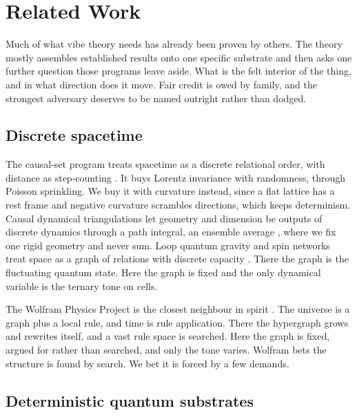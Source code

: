 \section{Related Work}

Much of what vibe theory needs has already been proven by others. The theory mostly assembles established results
onto one specific substrate and then asks one further question those programs leave aside. What is the felt
interior of the thing, and in what direction does it move. Fair credit is owed by family, and the strongest
adversary deserves to be named outright rather than dodged.

\subsection{Discrete spacetime}

The causal-set program treats spacetime as a discrete relational order, with distance as step-counting
\cite{bombelli1987causalsets, rideout1999, surya2019}. It buys Lorentz invariance with randomness, through Poisson
sprinkling. We buy it with curvature instead, since a flat lattice has a rest frame and negative curvature
scrambles directions, which keeps determinism. Causal dynamical triangulations let geometry and dimension be
outputs of discrete dynamics through a path integral, an ensemble average \cite{ambjorn2004, loll2019}, where we
fix one rigid geometry and never sum. Loop quantum gravity and spin networks treat space as a graph of relations
with discrete capacity \cite{rovelli1995}. There the graph is the fluctuating quantum state. Here the graph is
fixed and the only dynamical variable is the ternary tone on cells.

The Wolfram Physics Project is the closest neighbour in spirit \cite{wolfram2020}. The universe is a graph plus a
local rule, and time is rule application. There the hypergraph grows and rewrites itself, and a vast rule space is
searched. Here the graph is fixed, argued for rather than searched, and only the tone varies. Wolfram bets the
structure is found by search. We bet it is forced by a few demands.

\subsection{Deterministic quantum substrates}

